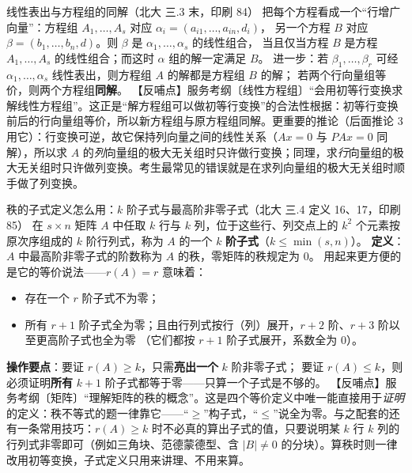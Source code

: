 \begin{fdeep}{线性表出与方程组的同解（北大 三.3 末，印刷 84）}
把每个方程看成一个“行增广向量”：方程组 $A_1,\dots,A_s$ 对应 $\alpha_i=(a_{i1},\dots,a_{in},d_i)$，
另一个方程 $B$ 对应 $\beta=(b_1,\dots,b_n,d)$。则 $\beta$ 是 $\alpha_1,\dots,\alpha_s$ 的线性组合，
当且仅当方程 $B$ 是方程 $A_1,\dots,A_s$ 的线性组合；而这时 $\alpha$ 组的解一定满足 $B$。
进一步：若 $\beta_1,\dots,\beta_r$ 可经 $\alpha_1,\dots,\alpha_s$ 线性表出，则方程组 $A$ 的解都是方程组 $B$ 的解；
若两个行向量组等价，则两个方程组\textbf{同解}。
【反哺点】服务考纲〔线性方程组〕“会用初等行变换求解线性方程组”。这正是“解方程组可以做初等行变换”的合法性根据：初等行变换前后的行向量组等价，所以新方程组与原方程组同解。更重要的推论（后面推论 3 用它）：行变换可逆，故它保持列向量之间的线性关系（$Ax=0$ 与 $PAx=0$ 同解），所以求 $A$ 的\emph{列}向量组的极大无关组时只许做行变换；同理，求\emph{行}向量组的极大无关组时只许做列变换。考生最常见的错误就是在求列向量组的极大无关组时顺手做了列变换。
\end{fdeep}

\begin{fdeep}{秩的子式定义怎么用：$k$ 阶子式与最高阶非零子式（北大 三.4 定义 16、17，印刷 85）}
在 $s\times n$ 矩阵 $A$ 中任取 $k$ 行与 $k$ 列，位于这些行、列交点上的 $k^2$ 个元素按原次序组成的
$k$ 阶行列式，称为 $A$ 的一个 $k$ \textbf{阶子式}（$k\le\min(s,n)$）。
\textbf{定义}：$A$ 中最高阶非零子式的阶数称为 $A$ 的秩，零矩阵的秩规定为 $0$。
用起来更方便的是它的等价说法——$r(A)=r$ 意味着：
\begin{itemize}[leftmargin=2.2em,itemsep=0.22em]
\item 存在一个 $r$ 阶子式不为零；
\item 所有 $r+1$ 阶子式全为零；且由行列式按行（列）展开，$r+2$ 阶、$r+3$ 阶以至更高阶子式也全为零
      （它们都按 $r+1$ 阶子式展开，系数全为 $0$）。
\end{itemize}
\textbf{操作要点}：要证 $r(A)\ge k$，只需\textbf{亮出一个} $k$ 阶非零子式；
要证 $r(A)\le k$，则必须证明\textbf{所有} $k+1$ 阶子式都等于零——只算一个子式是不够的。
【反哺点】服务考纲〔矩阵〕“理解矩阵的秩的概念”。这是四个等价定义中唯一能直接用于\emph{证明}的定义：秩不等式的题一律靠它——“$\ge$”构子式，“$\le$”说全为零。与之配套的还有一条常用技巧：$r(A)\ge k$ 时不必真的算出子式的值，只要说明某 $k$ 行 $k$ 列的行列式非零即可（例如三角块、范德蒙德型、含 $|B|\ne0$ 的分块）。算秩时则一律改用初等变换，子式定义只用来讲理、不用来算。
\end{fdeep}

